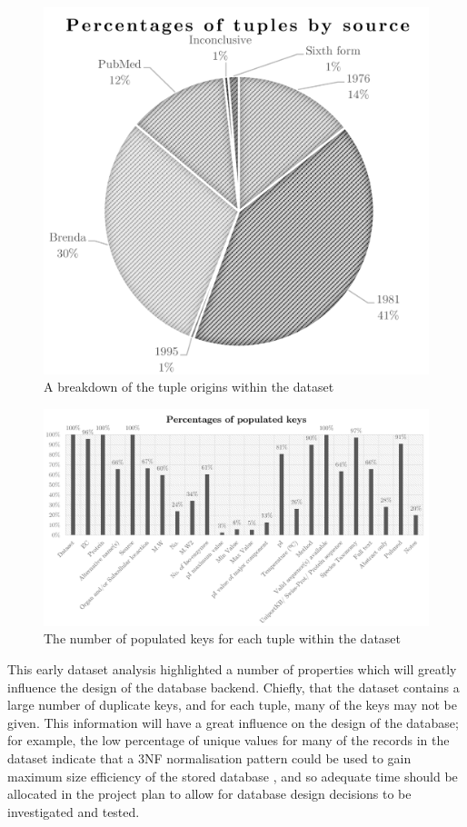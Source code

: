\begin{figure}[H]
\centering
\includegraphics{assets/chart-dataset-origin.png}
\caption{A breakdown of the tuple origins within the dataset}
\label{fig:chart-dataset-origin}
\end{figure}

\newpage
\begin{figure}[H]
\centering
\includegraphics{assets/chart-dataset-populated.png}
\caption{The number of populated keys for each tuple within the dataset}
\label{fig:chart-dataset-populated}
\end{figure}

This early dataset analysis highlighted a number of properties which will
greatly influence the design of the database backend. Chiefly, that the dataset
contains a large number of duplicate keys, and for each tuple, many of the keys
may not be given. This information will have a great influence on the design of
the database; for example, the low percentage of unique values for many of the
records in the dataset indicate that a 3NF normalisation pattern could be used
to gain maximum size efficiency of the stored database \cite{Maier1983}, and so
adequate time should be allocated in the project plan to allow for database
design decisions to be investigated and tested.

